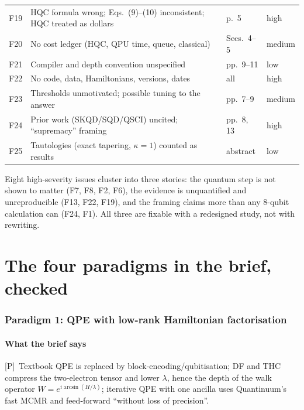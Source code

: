 \documentclass[11pt,a4paper]{article}
\newcommand{\lP}{\textcolor{keyblue}{[P]}}   %
\newcommand{\takeaway}[1]{\par\smallskip\noindent{\bfseries\textcolor{keyblue}{Takeaway.}} #1\par\smallskip}
\begin{document}
\begin{center}
\begin{tabularx}{\linewidth}{@{}lYL{2.2cm}p{1.4cm}@{}}
F19 & HQC formula wrong; Eqs.~(9)--(10) inconsistent; HQC treated as dollars & p.~5 & high\\
F20 & No cost ledger (HQC, QPU time, queue, classical) & Secs.~4--5 & medium\\
F21 & Compiler and depth convention unspecified & pp.~9--11 & low\\
F22 & No code, data, Hamiltonians, versions, dates & all & high\\
F23 & Thresholds unmotivated; possible tuning to the answer & pp.~7--9 & medium\\
F24 & Prior work (SKQD/SQD/QSCI) uncited; ``supremacy'' framing & pp.~8, 13 & high\\
F25 & Tautologies (exact tapering, $\kappa=1$) counted as results & abstract & low\\
\bottomrule
\end{tabularx}
\end{center}

\takeaway{Eight high-severity issues cluster into three stories: the quantum step is not shown to matter (F7, F8, F2, F6), the evidence is unquantified and unreproducible (F13, F22, F19), and the framing claims more than any 8-qubit calculation can (F24, F1). All three are fixable with a redesigned study, not with rewriting.}

\clearpage
\part{The four paradigms in the brief, checked}

\section{Paradigm 1: QPE with low-rank Hamiltonian factorisation}\label{sec:p1}

\subsection{What the brief says}
\lP\ Textbook QPE is replaced by block-encoding/qubitisation; DF and THC compress the two-electron tensor and lower $\lambda$, hence the depth of the walk operator $W=e^{i\arcsin(H/\lambda)}$; iterative QPE with one ancilla uses Quantinuum's fast MCMR and feed-forward ``without loss of precision''.
\end{document}
